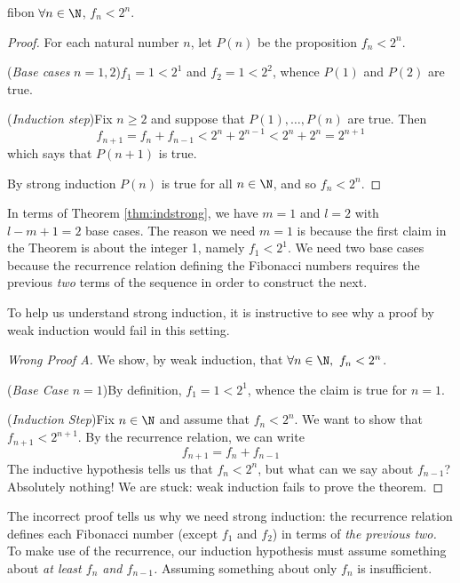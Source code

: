 \begin{thm}{}{fibon}
	$\forall n\in\N$, $f_n<2^n$.
\end{thm}

\begin{proof}
	For each natural number $n$, let $P(n)$ be the proposition $f_n<2^n$.\par
	(\emph{Base cases} $n=1,2$)\quad $f_1=1<2^1$ and $f_2=1<2^2$, whence $P(1)$ and $P(2)$ are true.\par
	(\emph{Induction step})\quad Fix $n\ge 2$ and suppose that $P(1),\ldots,P(n)$ are true. Then
	\[f_{n+1}=f_n+f_{n-1}<2^n+2^{n-1}<2^n+2^n=2^{n+1}\]
	which says that $P(n+1)$ is true.\par
	By strong induction $P(n)$ is true for all $n\in\N$, and so $f_n<2^n$.
\end{proof}

In terms of Theorem \ref{thm:indstrong}, we have $m=1$ and $l=2$ with $l-m+1=2$ base cases. The reason we need $m=1$ is because the first claim in the Theorem is about the integer 1, namely $f_1<2^1$. We need two base cases because the recurrence relation defining the Fibonacci numbers requires the previous \emph{two} terms of the sequence in order to construct the next.\par

To help us understand strong induction, it is instructive to see why a proof by weak induction would fail in this setting.

\begin{proof}[Wrong Proof A]
	We show, by weak induction, that $\forall n\in\N,\ f_n<2^n$.\par
	(\emph{Base Case} $n=1$)\quad By definition, $f_1=1<2^1$, whence the claim is true for $n=1$.\par
	(\emph{Induction Step})\quad Fix $n\in\N$ and assume that $f_n<2^n$. We want to show that $f_{n+1}<2^{n+1}$. By the recurrence relation, we can write
	\[
		f_{n+1}=f_n+f_{n-1}\tag*{($\ast$)}
	\]
	The inductive hypothesis tells us that $f_n<2^n$, but what can we say about $f_{n-1}$? Absolutely nothing! We are stuck: weak induction fails to prove the theorem.
\end{proof}

The incorrect proof tells us why we need strong induction: the recurrence relation defines each Fibonacci number (except $f_1$ and $f_2$) in terms of \emph{the previous two.} To make use of the recurrence, our induction hypothesis must assume something about \emph{at least $f_n$ and $f_{n-1}$.} Assuming something about only $f_n$ is insufficient.\par

